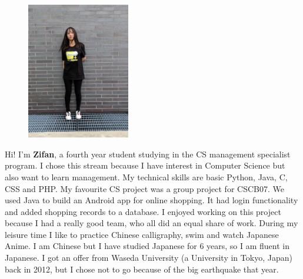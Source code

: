 \documentclass[12pt]{scrreprt}
\begin{document}
\begin{figure} 
	\includegraphics[angle=-90,origin=c,width=0.4\textwidth]{ashley}
\end{figure} 
\noindent Hi! I'm \textbf{Zifan}, a fourth year student studying in the CS management specialist program. I chose this stream because I have interest in Computer Science but also want to learn management. My technical skills are basic Python, Java, C, CSS and PHP. My favourite CS project was a group project for CSCB07. We used Java to build an Android app for online shopping. It had login functionality and added shopping records to a database. I enjoyed working on this project because I had a really good team, who all did an equal share of work. During my leisure time I like to practice Chinese calligraphy, swim and watch Japanese Anime. I am Chinese but I have studied Japanese for 6 years, so I am fluent in Japanese. I got an offer from Waseda University (a University in Tokyo, Japan) back in 2012, but I chose not to go because of the big earthquake that year.\\\\
\end{document}
